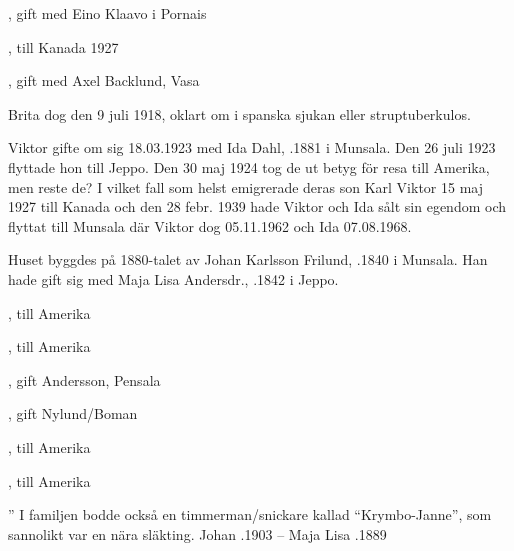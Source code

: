 \begin{jhchildren}
  \item {}, gift med Eino Klaavo i Pornais
  \item {}, till Kanada 1927
  \item {}, gift med Axel Backlund, Vasa
\end{jhchildren}

Brita dog den 9 juli 1918, oklart om i spanska sjukan eller struptuberkulos.



Viktor gifte om sig 18.03.1923 med Ida Dahl, .1881 i Munsala. Den 26 juli 1923 flyttade hon till Jeppo. Den 30 maj 1924 tog de ut betyg för resa till Amerika, men reste de? I vilket fall som helst emigrerade deras son Karl Viktor 15 maj 1927 till Kanada och  den 28 febr. 1939 hade Viktor och Ida sålt sin egendom och flyttat till Munsala där Viktor dog 05.11.1962 och Ida 07.08.1968.



Huset byggdes på 1880-talet av Johan Karlsson Frilund, .1840 i Munsala. Han hade gift sig med Maja Lisa Andersdr., .1842 i Jeppo.

\begin{jhchildren}
  \item {}, till Amerika
  \item {}, till Amerika
  \item {}
  \item {}, gift Andersson, Pensala
  \item {}, gift Nylund/Boman
  \item {}, till Amerika
  \item {}, till Amerika
\end{jhchildren}
               ”
I familjen bodde också en timmerman/snickare kallad ``Krymbo-Janne'', som sannolikt var en nära släkting.
Johan .1903  --  Maja Lisa .1889



